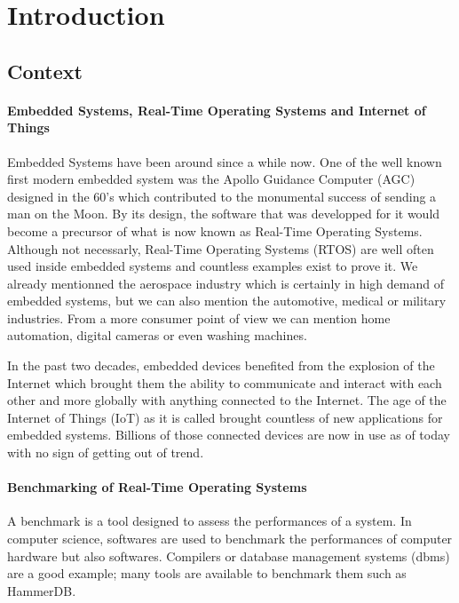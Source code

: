 \chapter*{Introduction}
%
%
\section*{Context}

\subsubsection*{Embedded Systems, Real-Time Operating Systems and Internet of Things}

Embedded Systems have been around since a while now.
One of the well known first modern embedded system was the Apollo Guidance Computer (AGC) designed in the 60's
    which contributed to the monumental success of sending a man on the Moon.
By its design, the software that was developped for it would become a precursor of what is now known as Real-Time Operating Systems.
Although not necessarly, Real-Time Operating Systems (RTOS) are well often used inside embedded systems and countless examples exist to prove it.
We already mentionned the aerospace industry which is certainly in high demand of embedded systems, 
    but we can also mention the automotive, medical or military industries.
From a more consumer point of view we can mention home automation, digital cameras or even washing machines.

In the past two decades, embedded devices benefited from the explosion of the Internet which brought them 
    the ability to communicate and interact with each other and more globally with anything connected to the Internet.
The age of the Internet of Things (IoT) as it is called brought countless of new applications for embedded systems.
Billions of those connected devices are now in use as of today with no sign of getting out of trend.

\subsubsection*{Benchmarking of Real-Time Operating Systems}

A benchmark is a tool designed to assess the performances of a system.
In computer science, softwares are used to benchmark the performances of computer hardware but also softwares.
Compilers or database management systems (dbms) are a good example; many tools are available to benchmark them such as HammerDB.

